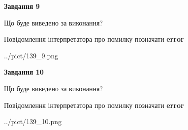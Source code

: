 \documentclass[12pt, ukrainian]{article}
\begin{document}
{{\begin {center}\textbf{Завдання 9}\end {center}}\par
Що буде виведено за виконання? \par
Повідомлення інтерпретатора про помилку позначати \textbf{error}

\begin{center}
	{../pict/139_9.png}
\end{center}
\newpage

{\begin {center}\textbf{Завдання 10}\end {center}}\par
Що буде виведено за виконання? \par
Повідомлення інтерпретатора про помилку позначати \textbf{error}

\begin{center}
	{../pict/139_10.png}
\end{center}
\newpage

}
\end{document}
